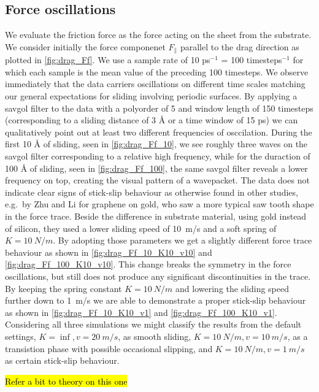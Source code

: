 \subsection{Force oscillations}\label{sec:force_oscillations}
We evaluate the friction force as the force acting on the sheet from the
substrate. We consider initially the force componenet $F_{\parallel}$ parallel
to the drag direction as plotted in \cref{fig:drag_Ff}. We use a sample rate of
10 ps$^{-1}$ = 100 timesteps$^{-1}$ for which each sample is the mean value of
the preceding 100 timesteps. We observe immediately that the data carriers
oscillations on different time scales matching our general expectations for
sliding involving periodic surfaces. By applying a savgol filter to the data
with a polyorder of 5 and window length of 150 timesteps (corresponding to a
sliding distance of 3 Å or a time window of 15 ps) we can qualitatively point
out at least two different frequencies of osccilation. During the first 10 Å of
sliding, seen in \cref{fig:drag_Ff_10}, we see roughly three waves on the savgol
filter corresponding to a relative high frequency, while for the duraction of
100 Å of sliding, seen in \cref{fig:drag_Ff_100}, the same savgol filter reveals
a lower frequency on top, creating the visual pattern of a wavepacket. The data
does not indicate clear signs of stick-slip behaviour as otherwise found in
other studies, e.g.\ by Zhu and Li \cite{zhu_study_2018} for graphene on gold,
who saw a more typical saw tooth shape in the force trace. Beside the difference
in substrate material, using gold instead of silicon, they used a lower sliding
speed of \SI{10}{m/s} and a soft spring of $K = \SI{10}{N/m}$. By adopting those
parameters we get a slightly different force trace behaviour as shown in
\cref{fig:drag_Ff_10_K10_v10} and \cref{fig:drag_Ff_100_K10_v10}. This change
breaks the symmetry in the force oscillations, but still does not produce any
significant discontinuities in the trace. By keeping the spring constant $K =
\SI{10}{N/m}$ and lowering the sliding speed further down to \SI{1}{m/s} we are
able to demonstrate a proper stick-slip behaviour as shown in
\cref{fig:drag_Ff_10_K10_v1} and \cref{fig:drag_Ff_100_K10_v1}. Considering all
three simulations we might classify the results from the default settings, $K =
\inf, v = \SI{20}{m/s}$, as smooth sliding,  $K = \SI{10}{N/m}, v =
\SI{10}{m/s}$, as a transistion phase with possible occasional slipping, and $K
= \SI{10}{N/m}, v = \SI{1}{m/s}$ as certain stick-slip behaviour.

\hl{Refer a bit to theory on this one}

